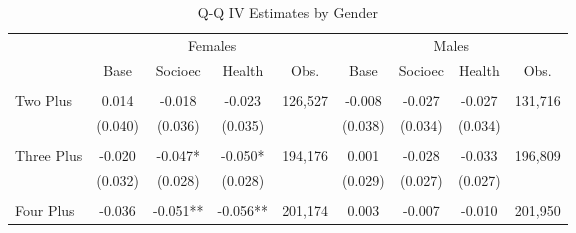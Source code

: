 \begin{table}[htpb!]\caption{Q-Q IV Estimates by Gender} 
\label{TWINtab:gend}\begin{center}\begin{tabular}{lcccccccc}
\toprule \toprule 
&\multicolumn{4}{c}{Females}&\multicolumn{4}{c}{Males}\\ 
\cmidrule(r){2-5} \cmidrule(r){6-9} 
&Base&Socioec&Health&Obs.&Base&Socioec&Health&Obs. \\ \midrule 
\begin{footnotesize}\end{footnotesize}&\begin{footnotesize}\end{footnotesize}&\begin{footnotesize}\end{footnotesize}&\begin{footnotesize}\end{footnotesize}&\begin{footnotesize}\end{footnotesize}&\begin{footnotesize}\end{footnotesize}&\\Two Plus &0.014&-0.018&-0.023&126,527&-0.008&-0.027&-0.027&131,716\\
&(0.040)&(0.036)&(0.035)&&(0.038)&(0.034)&(0.034)&\\
\begin{footnotesize}\end{footnotesize}&\begin{footnotesize}\end{footnotesize}&\begin{footnotesize}\end{footnotesize}&\begin{footnotesize}\end{footnotesize}&\begin{footnotesize}\end{footnotesize}&\begin{footnotesize}\end{footnotesize}&\\Three Plus &-0.020&-0.047*&-0.050*&194,176&0.001&-0.028&-0.033&196,809\\
&(0.032)&(0.028)&(0.028)&&(0.029)&(0.027)&(0.027)&\\
\begin{footnotesize}\end{footnotesize}&\begin{footnotesize}\end{footnotesize}&\begin{footnotesize}\end{footnotesize}&\begin{footnotesize}\end{footnotesize}&\begin{footnotesize}\end{footnotesize}&\begin{footnotesize}\end{footnotesize}&\\Four Plus &-0.036&-0.051**&-0.056**&201,174&0.003&-0.007&-0.010&201,950\\

\end{tabular}
\end{center}
\end{table}
